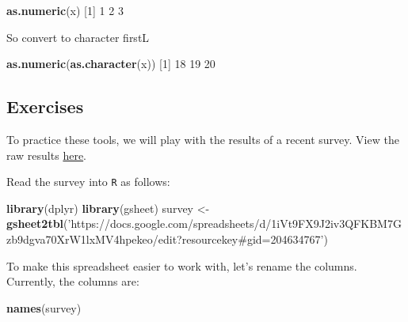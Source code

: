 \documentclass[]{book}
\newenvironment{Shaded}{\begin{snugshade}}{\end{snugshade}}
\newcommand{\DecValTok}[1]{\textcolor[rgb]{0.00,0.00,0.81}{#1}}
\newcommand{\KeywordTok}[1]{\textcolor[rgb]{0.13,0.29,0.53}{\textbf{#1}}}
\newcommand{\NormalTok}[1]{#1}
\newcommand{\StringTok}[1]{\textcolor[rgb]{0.31,0.60,0.02}{#1}}
\begin{document}
\begin{Shaded}
\begin{Highlighting}[]
\KeywordTok{as.numeric}\NormalTok{(x)}
\NormalTok{[}\DecValTok{1}\NormalTok{] }\DecValTok{1} \DecValTok{2} \DecValTok{3}
\end{Highlighting}
\end{Shaded}

So convert to character firstL

\begin{Shaded}
\begin{Highlighting}[]
\KeywordTok{as.numeric}\NormalTok{(}\KeywordTok{as.character}\NormalTok{(x))}
\NormalTok{[}\DecValTok{1}\NormalTok{] }\DecValTok{18} \DecValTok{19} \DecValTok{20}
\end{Highlighting}
\end{Shaded}

\hypertarget{exercises-16}{%
\subsection*{Exercises}\label{exercises-16}}

To practice these tools, we will play with the results of a recent survey. View the raw results \href{'https://docs.google.com/spreadsheets/d/1iVt9FX9J2iv3QFKBM7Gzb9dgva70XrW1lxMV4hpekeo/edit?resourcekey\#gid=204634767'}{here}.

Read the survey into \texttt{R} as follows:

\begin{Shaded}
\begin{Highlighting}[]
\KeywordTok{library}\NormalTok{(dplyr)}
\KeywordTok{library}\NormalTok{(gsheet)}
\NormalTok{survey <-}\StringTok{ }\KeywordTok{gsheet2tbl}\NormalTok{(}\StringTok{'https://docs.google.com/spreadsheets/d/1iVt9FX9J2iv3QFKBM7Gzb9dgva70XrW1lxMV4hpekeo/edit?resourcekey#gid=204634767'}\NormalTok{)}
\end{Highlighting}
\end{Shaded}

To make this spreadsheet easier to work with, let's rename the columns. Currently, the columns are:

\begin{Shaded}
\begin{Highlighting}[]
\KeywordTok{names}\NormalTok{(survey)}
\end{Highlighting}
\end{Shaded}
\end{document}
